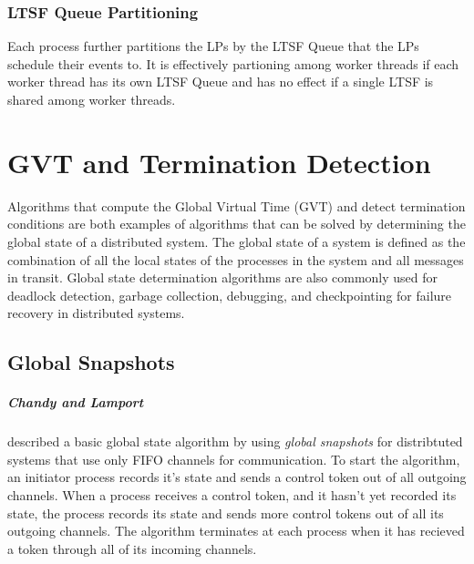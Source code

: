 \documentclass[11pt]{book}
\begin{document}

\subsection{LTSF Queue Partitioning}

Each process further partitions the LPs by the LTSF Queue that the LPs schedule their
events to. It is effectively partioning among worker threads if each worker thread has its
own LTSF Queue and has no effect if a single LTSF is shared among worker threads.


\chapter{GVT and Termination Detection}\label{gvt_termination}

Algorithms that compute the Global Virtual Time (GVT) and detect termination conditions are
both examples of algorithms that can be solved by determining the global state of a
distributed system. The global state of a system is defined as the combination of all
the local states of the processes in the system and all messages in transit. Global state
determination algorithms are also commonly used for deadlock detection, garbage collection,
debugging, and checkpointing for failure recovery in distributed systems.

\section{Global Snapshots}

\paragraph{Chandy and Lamport}\cite{chandy-85} described a basic global state algorithm by
using \emph{global snapshots} for distribtuted systems that use only FIFO channels for
communication. To start the algorithm, an initiator process records it's state and sends
a control token out of all outgoing channels. When a process receives a control token, and
it hasn't yet recorded its state, the process records its state and sends more control
tokens out of all its outgoing channels. The algorithm terminates at each process when it
has recieved a token through all of its incoming channels.
\end{document}

